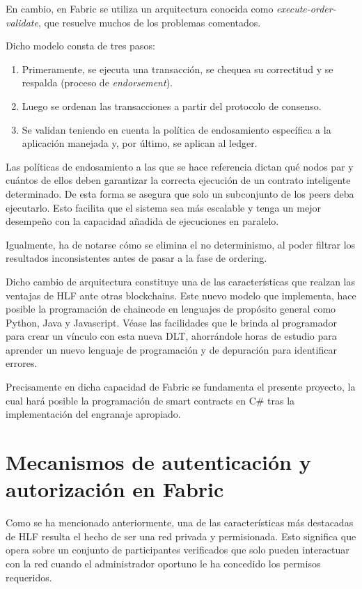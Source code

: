 En cambio, en Fabric se utiliza un arquitectura conocida como \emph{execute-order-validate}, que resuelve muchos de los problemas comentados.

Dicho modelo consta de tres pasos:
\begin{enumerate}
	\item Primeramente, se ejecuta una transacci\'on, se chequea su correctitud y se respalda (proceso de \emph{endorsement}).
	
	\item Luego se ordenan las transacciones a partir del protocolo de consenso.
	
	\item Se validan teniendo en cuenta la pol\'itica de endosamiento espec\'ifica a la aplicaci\'on manejada y, por \'ultimo, se aplican al ledger.
\end{enumerate}

Las pol\'iticas de endosamiento a las que se hace referencia dictan qu\'e nodos par y cu\'antos de ellos deben garantizar la correcta ejecuci\'on de un contrato inteligente determinado. De esta forma se asegura que solo un subconjunto de los peers deba ejecutarlo. Esto facilita que el sistema sea m\'as escalable y tenga un mejor desempe\~no con la capacidad a\~nadida de ejecuciones en paralelo.

Igualmente, ha de notarse c\'omo se elimina el no determinismo, al poder filtrar los resultados inconsistentes antes de pasar a la fase de ordering.

Dicho cambio de arquitectura constituye una de las caracter\'isticas que realzan las ventajas de HLF ante otras blockchains. Este nuevo modelo que implementa, hace posible la programaci\'on de chaincode en lenguajes de propósito general como Python, Java y Javascript. V\'ease las facilidades que le brinda al programador para crear un v\'inculo con esta nueva DLT, ahorr\'andole horas de estudio para aprender un nuevo lenguaje de programaci\'on y de depuraci\'on para identificar errores. %


Precisamente en dicha capacidad de Fabric se fundamenta el presente proyecto, la cual har\'a posible la programaci\'on de smart contracts en C\# tras la implementaci\'on del engranaje apropiado.
 
\section{Mecanismos de autenticaci\'on y\\ autorizaci\'on en Fabric}
Como se ha mencionado anteriormente, una de las caracter\'isticas m\'as destacadas de HLF resulta el hecho de ser una red privada y permisionada. Esto significa que opera sobre un conjunto de participantes verificados que solo pueden interactuar con la red cuando el administrador oportuno le ha concedido los permisos requeridos. 

